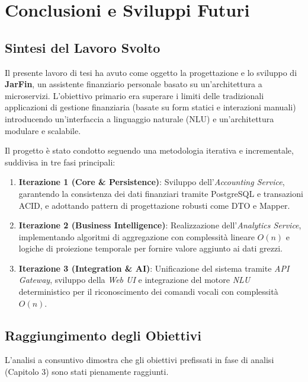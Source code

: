 \chapter{Conclusioni e Sviluppi Futuri}
\label{chap:conclusioni}

\section{Sintesi del Lavoro Svolto}

Il presente lavoro di tesi ha avuto come oggetto la progettazione e lo sviluppo di \textbf{JarFin}, un assistente finanziario personale basato su un'architettura a microservizi.
L'obiettivo primario era superare i limiti delle tradizionali applicazioni di gestione finanziaria (basate su form statici e interazioni manuali) introducendo un'interfaccia a linguaggio naturale (NLU) e un'architettura modulare e scalabile.

Il progetto è stato condotto seguendo una metodologia iterativa e incrementale, suddivisa in tre fasi principali:
\begin{enumerate}
    \item \textbf{Iterazione 1 (Core \& Persistence)}: Sviluppo dell'\textit{Accounting Service}, garantendo la consistenza dei dati finanziari tramite PostgreSQL e transazioni ACID, e adottando pattern di progettazione robusti come DTO e Mapper.
    \item \textbf{Iterazione 2 (Business Intelligence)}: Realizzazione dell'\textit{Analytics Service}, implementando algoritmi di aggregazione con complessità lineare $O(n)$ e logiche di proiezione temporale per fornire valore aggiunto ai dati grezzi.
    \item \textbf{Iterazione 3 (Integration \& AI)}: Unificazione del sistema tramite \textit{API Gateway}, sviluppo della \textit{Web UI} e integrazione del motore \textit{NLU} deterministico per il riconoscimento dei comandi vocali con complessità $O(n)$.
\end{enumerate}

\newpage

\section{Raggiungimento degli Obiettivi}

L'analisi a consuntivo dimostra che gli obiettivi prefissati in fase di analisi (Capitolo 3) sono stati pienamente raggiunti.

